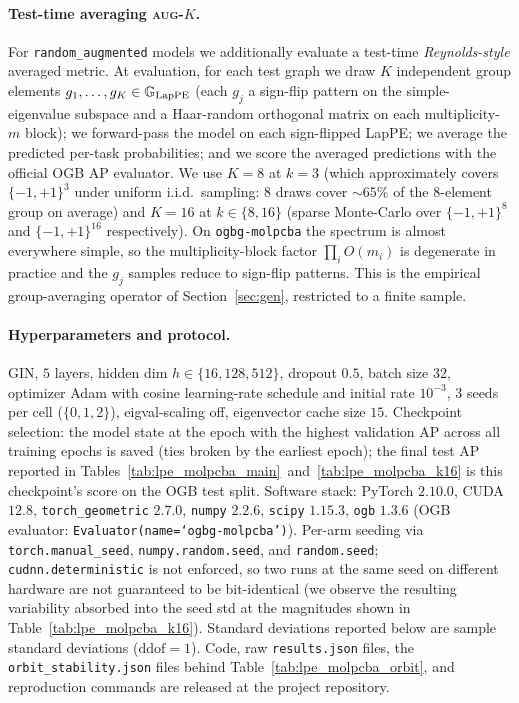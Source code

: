 \documentclass{article}
\begin{document}
\paragraph{Test-time averaging \textsc{aug-$K$}.}
For \texttt{random\_augmented} models we additionally evaluate a
test-time \emph{Reynolds-style} averaged metric. At evaluation, for
each test graph we draw $K$ independent group elements
$g_1,\ldots,g_K \in \mathbb{G}_{\mathrm{LapPE}}$ (each $g_j$ a sign-flip pattern
on the simple-eigenvalue subspace and a Haar-random orthogonal matrix
on each multiplicity-$m$ block); we forward-pass the model on each
sign-flipped LapPE; we average the predicted per-task probabilities;
and we score the averaged predictions with the official OGB AP
evaluator. We use $K\!=\!8$ at $k\!=\!3$ (which approximately covers
$\{-1,+1\}^{3}$ under uniform i.i.d.\ sampling: $8$ draws cover
$\sim\!65\%$ of the $8$-element group on average) and $K\!=\!16$ at
$k\!\in\!\{8,16\}$ (sparse Monte-Carlo over $\{-1,+1\}^{8}$ and
$\{-1,+1\}^{16}$ respectively). On \texttt{ogbg-molpcba} the
spectrum is almost everywhere simple, so the
multiplicity-block factor $\prod_i O(m_i)$ is degenerate in
practice and the $g_j$ samples reduce to sign-flip patterns.
This is the empirical group-averaging operator of
Section~\ref{sec:gen}, restricted to a finite sample.

\paragraph{Hyperparameters and protocol.}
GIN, $5$ layers, hidden dim $h\!\in\!\{16,128,512\}$, dropout $0.5$,
batch size $32$, optimizer Adam with cosine learning-rate schedule and
initial rate $10^{-3}$, $3$ seeds per cell ($\{0,1,2\}$),
eigval-scaling off, eigenvector cache size $15$. Checkpoint selection:
the model state at the epoch with the highest validation AP across
all training epochs is saved (ties broken by the earliest epoch); the final test AP reported in
Tables~\ref{tab:lpe_molpcba_main}~and~\ref{tab:lpe_molpcba_k16} is
this checkpoint's score on the OGB test split. Software stack:
PyTorch $2.10.0$, CUDA $12.8$, \texttt{torch\_geometric} $2.7.0$,
\texttt{numpy} $2.2.6$, \texttt{scipy} $1.15.3$, \texttt{ogb} $1.3.6$
(OGB evaluator: \texttt{Evaluator(name=`ogbg-molpcba')}). Per-arm
seeding via \texttt{torch.manual\_seed}, \texttt{numpy.random.seed},
and \texttt{random.seed}; \texttt{cudnn.deterministic} is not
enforced, so two runs at the same seed on different hardware are not
guaranteed to be bit-identical (we observe the resulting variability
absorbed into the seed std at the magnitudes shown in
Table~\ref{tab:lpe_molpcba_k16}). Standard deviations reported below
are sample standard deviations ($\mathrm{ddof}\!=\!1$). Code, raw
\texttt{results.json} files, the \texttt{orbit\_stability.json} files
behind Table~\ref{tab:lpe_molpcba_orbit}, and reproduction commands
are released at the project repository.
\end{document}
